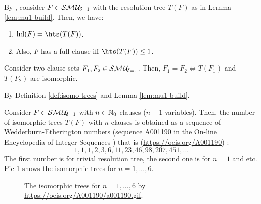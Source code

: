 \documentclass{report}
\begin{document}
\begin{lem}\label{lem:smu1hs1}
By \cite{GwynneKullmann2013GoodRepresentations}, consider $F \in \mathcal{S}\mathcal{M\hspace{0.8pt}U}_{\!\delta=1}$ with the resolution tree $T(F)$ as in Lemma \ref{lem:mu1-build}. Then, we have:
  \begin{enumerate}
  \item $\hardness(F) = \hts(T(F))$.
  \item Also, $F$ has a full clause iff $\hts(T(F)) \le 1$.
  \end{enumerate}
\end{lem}

\begin{lem}\label{lem:mu1-iso}
Consider two clause-sets $F_1,F_2 \in \mathcal{S}\mathcal{M\hspace{0.8pt}U}_{\!\delta=1}$. Then, $F_1=F_2 \iff T(F_1) $ and $T(F_2)$ are isomorphic.
\end{lem}    
\begin{prf}
By Definition \ref{def:isomo-trees} and Lemma \ref{lem:mu1-build}.
\end{prf}                                                                                                     
                                                                                                                                                                                                                                           
\begin{lem}\label{lem:mu1-iso-num}
Consider $F \in \mathcal{S}\mathcal{M\hspace{0.8pt}U}_{\!\delta=1}$ with $n \in \mathbb{N}_0$ clauses ($n-1$ variables). Then, the number of isomorphic trees $T(F)$ with $n$ clauses is obtained as a sequence of Wedderburn-Etherington numbers (sequence A001190 in the On-line Encyclopedia of Integer Sequences \cite{Sloane2008OEIS}) that is (\url{https://oeis.org/A001190}) :
\begin{displaymath}
 1, 1, 1, 2, 3, 6, 11, 23, 46, 98, 207, 451, ...
\end{displaymath}
The first number is for trivial resolution tree, the second one is for $n=1$ and etc. Pic \ref{fig:isotree} shows the isomorphic trees for $n=1,..., 6$.
 \begin{figure}
   \begin{center}
   \caption{The isomorphic trees for $n=1,..., 6$ by \url{https://oeis.org/A001190/a001190.gif}.}
   \label{fig:isotree}
   \end{center}
   \end{figure}
\end{lem}   
                             
\end{document}
